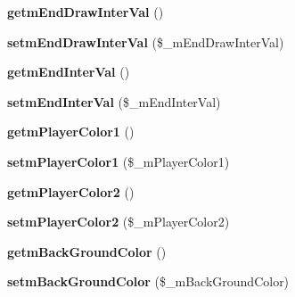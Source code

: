 \begin{DoxyCompactItemize}
\item 
{\bfseries getm\+End\+Draw\+Inter\+Val} ()\hypertarget{class_reversi_setting_a33a44adbf2f49b190bb2b5f51c1c1360}{}\label{class_reversi_setting_a33a44adbf2f49b190bb2b5f51c1c1360}

\item 
{\bfseries setm\+End\+Draw\+Inter\+Val} (\$\+\_\+m\+End\+Draw\+Inter\+Val)\hypertarget{class_reversi_setting_a27a5659dfe111d6cad5d9ec19e2254fb}{}\label{class_reversi_setting_a27a5659dfe111d6cad5d9ec19e2254fb}

\item 
{\bfseries getm\+End\+Inter\+Val} ()\hypertarget{class_reversi_setting_ae9a3d550ba5709f511fcdc3967684816}{}\label{class_reversi_setting_ae9a3d550ba5709f511fcdc3967684816}

\item 
{\bfseries setm\+End\+Inter\+Val} (\$\+\_\+m\+End\+Inter\+Val)\hypertarget{class_reversi_setting_aa1c85566dde92e56e7b81f2835d0d89e}{}\label{class_reversi_setting_aa1c85566dde92e56e7b81f2835d0d89e}

\item 
{\bfseries getm\+Player\+Color1} ()\hypertarget{class_reversi_setting_a091d9cd436e68f4c08d26f61fab3a016}{}\label{class_reversi_setting_a091d9cd436e68f4c08d26f61fab3a016}

\item 
{\bfseries setm\+Player\+Color1} (\$\+\_\+m\+Player\+Color1)\hypertarget{class_reversi_setting_a411006ea8845a27f5e33b4a555254d2d}{}\label{class_reversi_setting_a411006ea8845a27f5e33b4a555254d2d}

\item 
{\bfseries getm\+Player\+Color2} ()\hypertarget{class_reversi_setting_ad60404de7ef938cb3c26804c07abe7f7}{}\label{class_reversi_setting_ad60404de7ef938cb3c26804c07abe7f7}

\item 
{\bfseries setm\+Player\+Color2} (\$\+\_\+m\+Player\+Color2)\hypertarget{class_reversi_setting_a0a0e0d287c262fcc7f2fb27e0d9dbf3a}{}\label{class_reversi_setting_a0a0e0d287c262fcc7f2fb27e0d9dbf3a}

\item 
{\bfseries getm\+Back\+Ground\+Color} ()\hypertarget{class_reversi_setting_a540a19fc7d4fb7c17efa3c76403f4061}{}\label{class_reversi_setting_a540a19fc7d4fb7c17efa3c76403f4061}

\item 
{\bfseries setm\+Back\+Ground\+Color} (\$\+\_\+m\+Back\+Ground\+Color)\hypertarget{class_reversi_setting_ae9013ece88de1d06960aeeafe29b27e7}{}\label{class_reversi_setting_ae9013ece88de1d06960aeeafe29b27e7}


\end{DoxyCompactItemize}
